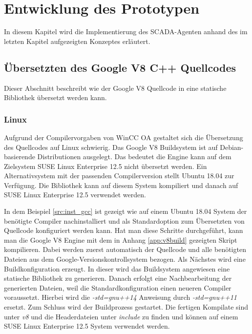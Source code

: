 \chapter{Entwicklung des Prototypen}
\label{cha:Projektumsetzung}

In diesem Kapitel wird die Implementierung des SCADA-Agenten anhand des im letzten Kapitel aufgezeigten Konzeptes erläutert.

\section{Übersetzten des Google V8 C++ Quellcodes}

Dieser Abschnitt beschreibt wie der Google V8 Quellcode in eine statische Bibliothek übersetzt werden kann.

\subsection{Linux}

Aufgrund der Compilervorgaben von WinCC OA gestaltet sich die Übersetzung des Quellcodes auf Linux schwierig. 
Das Google V8 Buildsystem ist auf Debian-basierende Distributionen ausgelegt. Das bedeutet die Engine kann auf dem Zielsystem
SUSE Linux Enterprise 12.5 nicht übersetzt werden. Ein Alternativsystem mit der passenden Compilerversion stellt Ubuntu 18.04
zur Verfügung. Die Bibliothek kann auf diesem System kompiliert und danach auf SUSE Linux Enterprise 12.5 verwendet werden.

\begin{program}[h]
\caption{Installation von GCC-4.8.5 auf Ubuntu 18.04}
\label{src:inst_gcc}
\end{program}

In dem Beispiel \ref{src:inst_gcc} ist gezeigt wie auf einem Ubuntu 18.04 System der benötigte Compiler nachinstalliert und als
Standardoption zum Übersetzten von Quellcode konfiguriert werden kann. Hat man diese Schritte durchgeführt, kann man die Google V8 Engine mit dem in Anhang 
\ref{app:v8build} gezeigten Skript kompilieren. Dabei werden zuerst automatisch der Quellcode und alle benötigten Dateien aus dem Google-Versionskontrollsystem 
bezogen. Als Nächstes wird eine Buildkonfiguration erzeugt. In dieser wird das Buildsystem angewiesen eine statische
Bibliothek zu generieren. Danach erfolgt eine Nachbearbeitung der generierten Dateien, weil die Standardkonfiguration einen neueren Compiler
voraussetzt. Hierbei wird die \textit{-std=gnu++14} Anweisung durch \textit{-std=gnu++11} ersetzt. Zum Schluss wird der Buildprozess 
gestartet. Die fertigen Kompilate sind unter \textit{v8} und die Headerdateien unter \textit{include} zu finden und können auf einem SUSE Linux Enterprise 12.5
System verwendet werden. 

